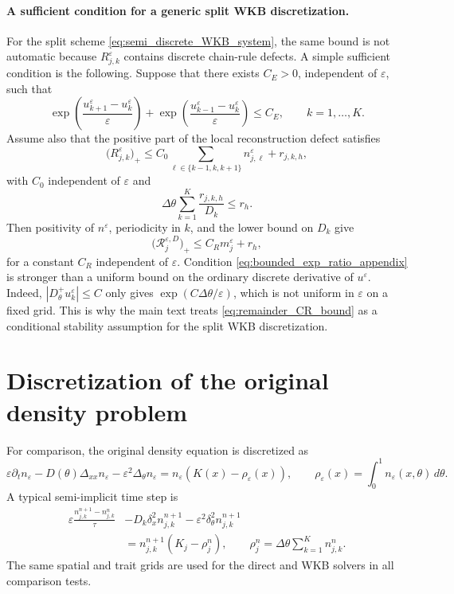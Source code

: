 \documentclass[11pt]{article}
\begin{document}
\paragraph{A sufficient condition for a generic split WKB discretization.}
For the split scheme \eqref{eq:semi_discrete_WKB_system}, the same bound is not
automatic because \(R_{j,k}^\varepsilon\) contains discrete chain-rule defects.
A simple sufficient condition is the following. Suppose that there exists
\(C_E>0\), independent of \(\varepsilon\), such that
\begin{equation}\label{eq:bounded_exp_ratio_appendix}
    \exp\left(\frac{u_{k+1}^\varepsilon-u_k^\varepsilon}{\varepsilon}\right)
    +
    \exp\left(\frac{u_{k-1}^\varepsilon-u_k^\varepsilon}{\varepsilon}\right)
    \le C_E,
    \qquad k=1,\ldots,K .
\end{equation}
Assume also that the positive part of the local reconstruction defect satisfies
\begin{equation}\label{eq:local_defect_appendix}
    \bigl(R_{j,k}^\varepsilon\bigr)_+
    \le
    C_0
    \sum_{\ell\in\{k-1,k,k+1\}}
    n_{j,\ell}^\varepsilon
    +
    r_{j,k,h},
\end{equation}
with \(C_0\) independent of \(\varepsilon\) and
\[
    \Delta\theta\sum_{k=1}^K\frac{r_{j,k,h}}{D_k}\le r_h .
\]
Then positivity of \(n^\varepsilon\), periodicity in \(k\), and the lower bound
on \(D_k\) give
\[
    \bigl(\mathcal R_j^{\varepsilon,D}\bigr)_+
    \le
    C_Rm_j^\varepsilon+r_h,
\]
for a constant \(C_R\) independent of \(\varepsilon\). Condition
\eqref{eq:bounded_exp_ratio_appendix} is stronger than a uniform bound on the
ordinary discrete derivative of \(u^\varepsilon\). Indeed,
\(|D_\theta^+u_k^\varepsilon|\le C\) only gives
\(\exp(C\Delta\theta/\varepsilon)\), which is not uniform in
\(\varepsilon\) on a fixed grid. This is why the main text treats
\eqref{eq:remainder_CR_bound} as a conditional stability assumption for the
split WKB discretization.

\section{Discretization of the original density problem}
\label{append:direct_density}

For comparison, the original density equation is discretized as
\[
    \varepsilon \partial_t n_\varepsilon
    -
    D(\theta)\Delta_{xx}n_\varepsilon
    -
    \varepsilon^2\Delta_\theta n_\varepsilon
    =
    n_\varepsilon(K(x)-\rho_\varepsilon(x)),
    \qquad
    \rho_\varepsilon(x)=\int_0^1 n_\varepsilon(x,\theta)\,d\theta .
\]
A typical semi-implicit time step is
\[
\begin{aligned}
\varepsilon
\frac{n_{j,k}^{n+1}-n_{j,k}^n}{\tau}
&-
D_k\delta_x^2n_{j,k}^{n+1}
-
\varepsilon^2\delta_\theta^2n_{j,k}^{n+1}
\\
&=
    n_{j,k}^{n+1}(K_j-\rho_j^n),
    \qquad
    \rho_j^n=\Delta\theta\sum_{k=1}^K n_{j,k}^n .
\end{aligned}
\]
The same spatial and trait grids are used for the direct and WKB solvers in
all comparison tests.
\end{document}
